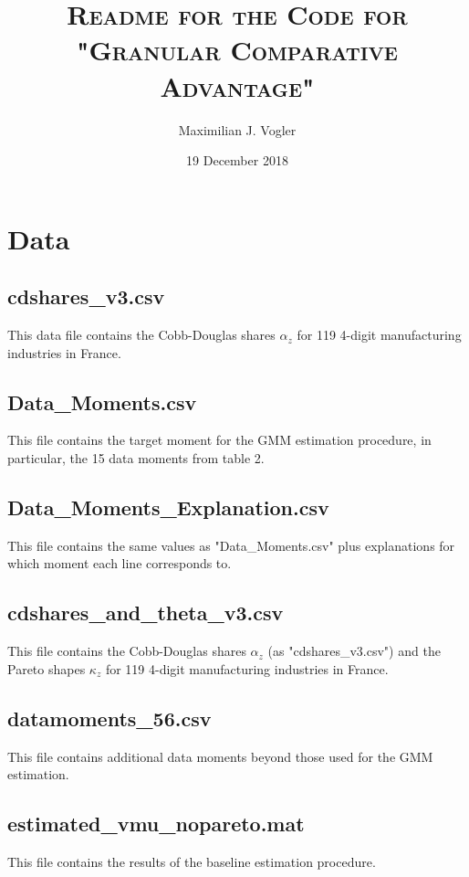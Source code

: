 \documentclass[12pt,a4paper,oneside]{article}
\begin{document}
\title{\textsc{Readme for the Code for "Granular Comparative Advantage"}}
\author{Maximilian J. Vogler}
\date{19 December 2018}


\makeatletter
\let\runauthor\@author
\let\runtitle\@title    
\makeatother

\maketitle
\tableofcontents
\noindent

\newpage

\section{Data}

\subsection{cdshares\_v3.csv}
This data file contains the Cobb-Douglas shares $\alpha_z$ for 119 4-digit manufacturing industries in France.
\subsection{Data\_Moments.csv}
This file contains the target moment for the GMM estimation procedure, in particular, the 15 data moments from table 2.
\subsection{Data\_Moments\_Explanation.csv}
This file contains the same values as "Data\_Moments.csv" plus explanations for which moment each line corresponds to.
\subsection{cdshares\_and\_theta\_v3.csv}
This file contains the Cobb-Douglas shares  $\alpha_z$  (as "cdshares\_v3.csv") and the Pareto shapes $\kappa_z$ for 119 4-digit manufacturing industries in France. 
\subsection{datamoments\_56.csv}
This file contains additional data moments beyond those used for the GMM estimation.
\subsection{estimated\_vmu\_nopareto.mat}
This file contains the results of the baseline estimation procedure.
\end{document}
